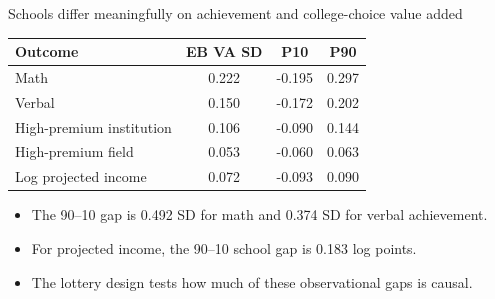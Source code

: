 \documentclass[11pt,aspectratio=169]{beamer}
\begin{document}
\begin{frame}{Schools differ meaningfully on achievement and college-choice value added}
\centering
\small
\setlength{\tabcolsep}{8pt}
\begin{tabular}{lccc}
\toprule
Outcome & EB VA SD & P10 & P90 \\
\midrule
Math & 0.222 & -0.195 & 0.297 \\
Verbal & 0.150 & -0.172 & 0.202 \\
High-premium institution & 0.106 & -0.090 & 0.144 \\
High-premium field & 0.053 & -0.060 & 0.063 \\
Log projected income & 0.072 & -0.093 & 0.090 \\
\bottomrule
\end{tabular}

\vspace{1em}
\raggedright
\begin{itemize}
  \addtolength{\itemsep}{0.35em}
  \item The 90--10 gap is 0.492 SD for math and 0.374 SD for verbal achievement.
  \item For projected income, the 90--10 school gap is 0.183 log points.
  \item The lottery design tests how much of these observational gaps is causal.
\end{itemize}
\end{frame}
\end{document}
